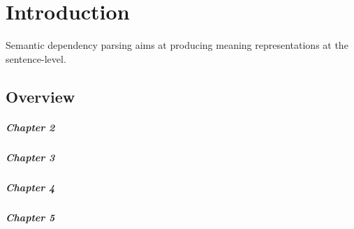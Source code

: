 \chapter{Introduction}
\label{chap:introduction}

Semantic dependency parsing aims at producing meaning representations at the sentence-level. 

\section{Overview}

\paragraph{Chapter 2}

\paragraph{Chapter 3} 

\paragraph{Chapter 4} 

\paragraph{Chapter 5} 